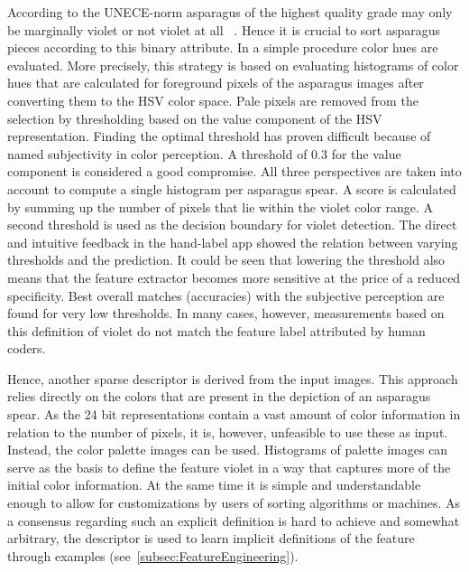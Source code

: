 \bigskip
According to the UNECE-norm asparagus of the highest quality grade may only be marginally violet or not violet at all ~\citep{unspargelnorm}. Hence it is crucial to sort asparagus pieces according to this binary attribute. In a simple procedure color hues are evaluated. More precisely, this strategy is based on evaluating histograms of color hues that are calculated for foreground pixels of the asparagus images after converting them to the HSV color space. Pale pixels are removed from the selection by thresholding based on the value component of the HSV representation. Finding the optimal threshold has proven difficult because of named subjectivity in color perception. A threshold of 0.3 for the value component is considered a good compromise. All three perspectives are taken into account to compute a single histogram per asparagus spear. A score is calculated by summing up the number of pixels that lie within the violet color range. A second threshold is used as the decision boundary for violet detection. The direct and intuitive feedback in the hand-label app showed the relation between varying thresholds and the prediction. It could be seen that lowering the threshold also means that the feature extractor becomes more sensitive at the price of a reduced specificity. Best overall matches (accuracies) with the subjective perception are found for very low thresholds. In many cases, however, measurements based on this definition of violet do not match the feature label attributed by human coders.

Hence, another sparse descriptor is derived from the input images. This approach relies directly on the colors that are present in the depiction of an asparagus spear. As the 24 bit representations contain a vast amount of color information in relation to the number of pixels, it is, however, unfeasible to use these as input. Instead, the color palette images can be used. Histograms of palette images can serve as the basis to define the feature violet in a way that captures more of the initial color information. At the same time it is simple and understandable enough to allow for customizations by users of sorting algorithms or machines. As a consensus regarding such an explicit definition is hard to achieve and somewhat arbitrary, the descriptor is used to learn implicit definitions of the feature through examples (see~\autoref{subsec:FeatureEngineering}).

